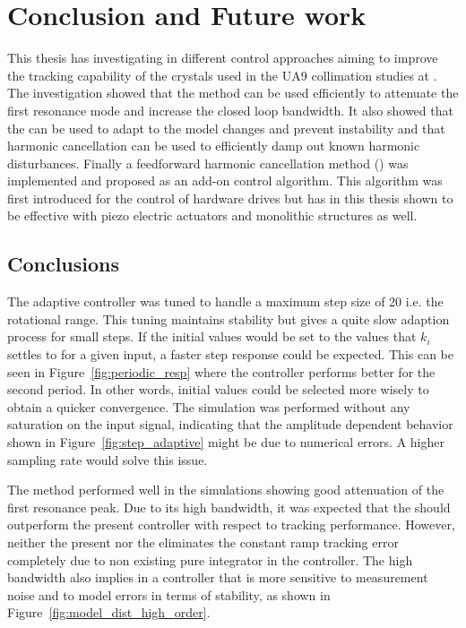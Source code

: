 \chapter{Conclusion and Future work}\label{cha:conclusion}
This thesis has investigating in different control approaches aiming to improve the tracking capability of the crystals used in the UA9 collimation studies at \abbrCERN. The investigation showed that the \abbrIRC method can be used efficiently to attenuate the first resonance mode and increase the closed loop bandwidth. It also showed that the \abbrMRACPE can be used to adapt to the model changes and prevent instability and that harmonic cancellation can be used to efficiently damp out known harmonic disturbances. Finally a feedforward harmonic cancellation method (\abbrRFDC) was implemented and proposed as an add-on control algorithm. This algorithm was first introduced for the control of hardware drives but has in this thesis shown to be effective with piezo electric actuators and monolithic structures as well.


\section{Conclusions}
The adaptive controller was tuned to handle a maximum step size of \unit{20}{\milli\radian} i.e. the rotational range. This tuning maintains stability but gives a quite slow adaption process for small steps. If the initial values would be set to the values that $k_i$ settles to for a given input, a faster step response could be expected. This can be seen in Figure~\ref{fig:periodic_resp} where the controller performs better for the second period. In other words, initial values could be selected more wisely to obtain a quicker convergence.  The simulation was performed without any saturation on the input signal, indicating that the amplitude dependent behavior shown in Figure~\ref{fig:step_adaptive} might be due to numerical errors. A higher sampling rate would solve this issue.

The \abbrIRC method performed well in the simulations showing good attenuation of the first resonance peak. Due to its high bandwidth, it was expected that the \abbrIRC should outperform the present controller with respect to tracking performance. However, neither the present nor the \abbrIRC eliminates the constant ramp tracking error completely due to non existing pure integrator in the controller. The high bandwidth also implies in a controller that is more sensitive to measurement noise and to model errors in terms of stability, as shown in Figure~\ref{fig:model_dist_high_order}.


